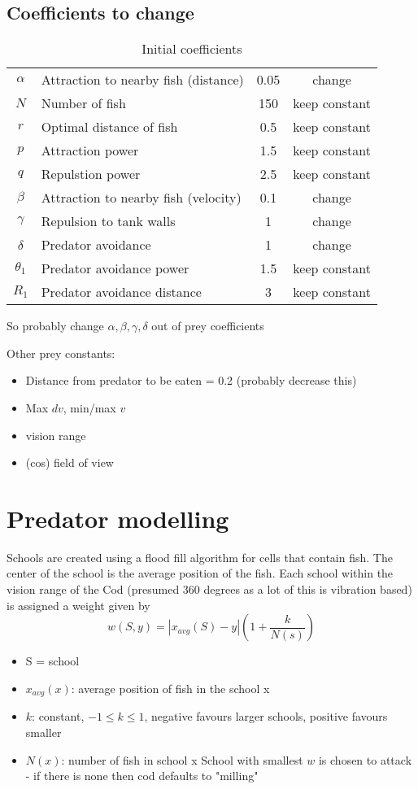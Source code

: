 \subsection{Coefficients to change}

\begin{table}
    \centering
    \begin{tabular}{clcc}
         $\alpha$ &Attraction to nearby fish (distance)&  0.05& change\\
         $N$ &Number of fish&  150& keep constant\\
         $r$ &Optimal distance of fish&  0.5& keep constant\\
         $p$ &Attraction power&  1.5& keep constant\\
         $q$ &Repulstion power&  2.5& keep constant\\
         $\beta$ &Attraction to nearby fish (velocity)&  0.1& change\\
         $\gamma$ &Repulsion to tank walls&  1& change\\
         $\delta$ &Predator avoidance&  1& change\\
         $\theta_1$ &Predator avoidance power&  1.5& keep constant\\
         $R_1$ &Predator avoidance distance&  3& keep constant\\
    \end{tabular}
    \caption{Initial coefficients}
    \label{tab:prey_coeff}
\end{table}
So probably change $\alpha,\beta,\gamma, \delta$ out of prey coefficients\par
Other prey constants:
\begin{itemize}
    \item Distance from predator to be eaten = 0.2 (probably decrease this)
    \item Max $dv$, min/max $v$
    \item vision range
    \item (cos) field of view
\end{itemize}
\section{Predator modelling}
Schools are created using a flood fill algorithm for cells that contain fish. The center of the school is the average position of the fish.
Each school within the vision range of the Cod (presumed 360 degrees as a lot of this is vibration based) is assigned a weight given by
\begin{equation}
    w(S,y) = |x_{avg}(S)-y|\left(1+\frac{k}{N(s)}\right)
\end{equation}
\begin{itemize}
    \item S = school
    \item $x_{avg}(x)$: average position of fish in the school x
    \item $k$: constant, $-1\le k\le 1$, negative favours larger schools, positive favours smaller
    \item $N(x)$: number of fish in school x
School with smallest $w$ is chosen to attack - if there is none then cod defaults to "milling"
\end{itemize}
